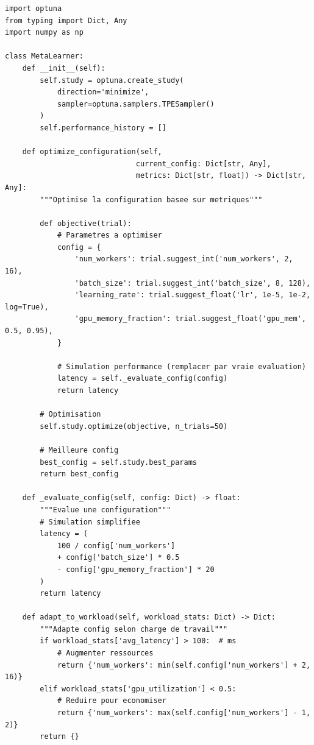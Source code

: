 \documentclass[12pt,a4paper]{article}
\begin{document}
\begin{lstlisting}[caption={Implémentation Meta-Learner}]
import optuna
from typing import Dict, Any
import numpy as np

class MetaLearner:
    def __init__(self):
        self.study = optuna.create_study(
            direction='minimize',
            sampler=optuna.samplers.TPESampler()
        )
        self.performance_history = []
        
    def optimize_configuration(self, 
                              current_config: Dict[str, Any],
                              metrics: Dict[str, float]) -> Dict[str, Any]:
        """Optimise la configuration basee sur metriques"""
        
        def objective(trial):
            # Parametres a optimiser
            config = {
                'num_workers': trial.suggest_int('num_workers', 2, 16),
                'batch_size': trial.suggest_int('batch_size', 8, 128),
                'learning_rate': trial.suggest_float('lr', 1e-5, 1e-2, log=True),
                'gpu_memory_fraction': trial.suggest_float('gpu_mem', 0.5, 0.95),
            }
            
            # Simulation performance (remplacer par vraie evaluation)
            latency = self._evaluate_config(config)
            return latency
            
        # Optimisation
        self.study.optimize(objective, n_trials=50)
        
        # Meilleure config
        best_config = self.study.best_params
        return best_config
        
    def _evaluate_config(self, config: Dict) -> float:
        """Evalue une configuration"""
        # Simulation simplifiee
        latency = (
            100 / config['num_workers'] 
            + config['batch_size'] * 0.5
            - config['gpu_memory_fraction'] * 20
        )
        return latency
        
    def adapt_to_workload(self, workload_stats: Dict) -> Dict:
        """Adapte config selon charge de travail"""
        if workload_stats['avg_latency'] > 100:  # ms
            # Augmenter ressources
            return {'num_workers': min(self.config['num_workers'] + 2, 16)}
        elif workload_stats['gpu_utilization'] < 0.5:
            # Reduire pour economiser
            return {'num_workers': max(self.config['num_workers'] - 1, 2)}
        return {}
\end{lstlisting}
\end{document}
